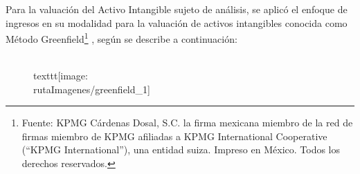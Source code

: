 
Para la valuación del Activo Intangible sujeto de análisis, se aplicó el enfoque de ingresos en su modalidad para la valuación de activos intangibles conocida como \textcolor{principal}{Método Greenfield\footnote{Fuente: KPMG Cárdenas Dosal, S.C. la firma mexicana miembro de la red de firmas miembro de KPMG afiliadas a KPMG International Cooperative (``KPMG International''), una entidad suiza. Impreso en México. Todos los derechos reservados. }} , según se describe a continuación:


\begin{figure}[H]
\centering
\\texttt{[image: \\rutaImagenes/greenfield\_1]}\\

\end{figure}
